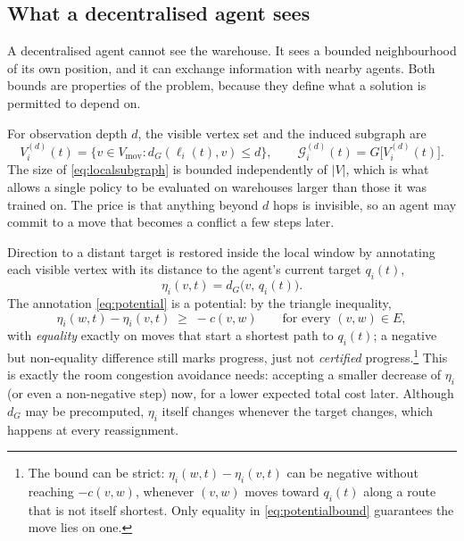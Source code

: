 \documentclass[../main.tex]{subfiles}
\begin{document}
\subsection{What a decentralised agent sees}
\label{sec:pf:observations}

A decentralised agent cannot see the warehouse. It sees a bounded neighbourhood
of its own position, and it can exchange information with nearby agents. Both
bounds are properties of the problem, because they define what a solution is
permitted to depend on.

For observation depth $d$, the visible vertex set and the induced subgraph are
\begin{equation}
  V^{(d)}_i(t) = \{ v \in V_{\mathrm{mov}} : d_G(\ell_i(t), v) \le d \},
  \qquad
  \mathcal{G}^{(d)}_i(t) = G\bigl[V^{(d)}_i(t)\bigr].
  \label{eq:localsubgraph}
\end{equation}
The size of \eqref{eq:localsubgraph} is bounded independently of $|V|$, which is
what allows a single policy to be evaluated on warehouses larger than those it
was trained on. The price is that anything beyond $d$ hops is invisible, so an
agent may commit to a move that becomes a conflict a few steps later.

Direction to a distant target is restored inside the local window by annotating
each visible vertex with its distance to the agent's current target $q_i(t)$,
\begin{equation}
  \eta_i(v,t) = d_G\bigl(v,\, q_i(t)\bigr).
  \label{eq:potential}
\end{equation}
The annotation \eqref{eq:potential} is a potential: by the triangle inequality, %
\begin{equation}
  \eta_i(w,t) - \eta_i(v,t) \;\ge\; -c(v,w) \qquad \text{for every } (v,w) \in E,
  \label{eq:potentialbound}
\end{equation}
with \emph{equality} exactly on moves that start a shortest path to
$q_i(t)$; a negative but non-equality difference still marks progress, just
not \emph{certified} progress.\footnote{The bound can be strict: $\eta_i(w,t)
- \eta_i(v,t)$ can be negative without reaching $-c(v,w)$, whenever $(v,w)$
moves toward $q_i(t)$ along a route that is not itself shortest. Only
equality in \eqref{eq:potentialbound} guarantees the move lies on one.} This
is exactly the room congestion avoidance needs: accepting a smaller decrease
of $\eta_i$ (or even a non-negative step) now, for a lower expected total cost
later. Although $d_G$ may be precomputed, $\eta_i$ itself changes whenever the
target changes, which happens at every reassignment.
\end{document}
